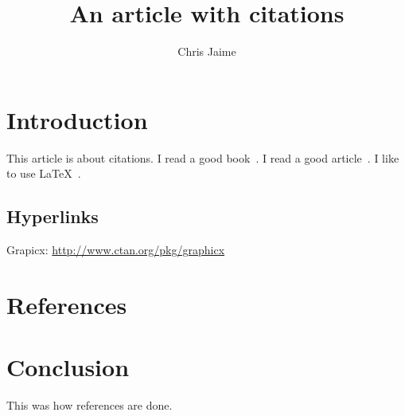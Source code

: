 \documentclass{article}
\title{An article with citations}
\author{Chris Jaime}
\date{}
\begin{document}
\maketitle

\section{Introduction}
This article is about citations. I read a good book~\cite{smith2012}.
I read a good article~\cite{hall2013}. I like to use \LaTeX~\cite{latex}.

\subsection{Hyperlinks}
Grapicx: \url{http://www.ctan.org/pkg/graphicx}

\section{References}


\section{Conclusion}
This was how references are done.
\end{document}
